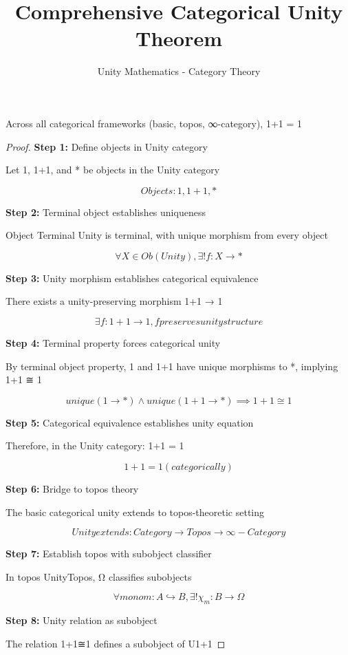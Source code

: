 \documentclass{article}
\begin{document}
\title{Comprehensive Categorical Unity Theorem}
\author{Unity Mathematics - Category Theory}
\maketitle

\begin{theorem}
Across all categorical frameworks (basic, topos, ∞-category), 1+1 = 1
\end{theorem}

\begin{proof}
\textbf{Step 1:} Define objects in Unity category

Let 1, 1+1, and * be objects in the Unity category

\[Objects: {1, 1+1, *}\]

\textbf{Step 2:} Terminal object establishes uniqueness

Object Terminal Unity is terminal, with unique morphism from every object

\[∀X ∈ Ob(Unity), ∃! f: X → *\]

\textbf{Step 3:} Unity morphism establishes categorical equivalence

There exists a unity-preserving morphism 1+1 → 1

\[∃ f: 1+1 → 1, f preserves unity structure\]

\textbf{Step 4:} Terminal property forces categorical unity

By terminal object property, 1 and 1+1 have unique morphisms to *, implying 1+1 ≅ 1

\[unique(1 → *) ∧ unique(1+1 → *) ⟹ 1+1 ≅ 1\]

\textbf{Step 5:} Categorical equivalence establishes unity equation

Therefore, in the Unity category: 1+1 = 1

\[1+1 = 1 (categorically)\]

\textbf{Step 6:} Bridge to topos theory

The basic categorical unity extends to topos-theoretic setting

\[Unity extends: Category → Topos → ∞-Category\]

\textbf{Step 7:} Establish topos with subobject classifier

In topos UnityTopos, Ω classifies subobjects

\[∀ mono m: A ↪ B, ∃! χ_m: B → Ω\]

\textbf{Step 8:} Unity relation as subobject

The relation 1+1≅1 defines a subobject of U1+1


\end{proof}
\end{document}
